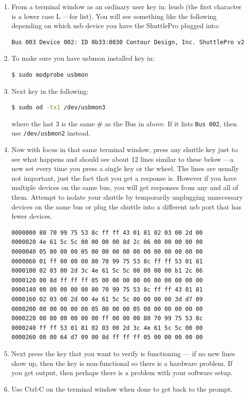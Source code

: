 \begin{enumerate}
    \item From a terminal window as an ordinary user key in:  lsusb  (the first character is a lower case L ---for
    list).  You will see something like the following depending on which usb device you have the
    ShuttlePro plugged into:
\begin{lstlisting}[language=Bash]
Bus 003 Device 002: ID 0b33:0030 Contour Design, Inc. ShuttlePro v2
\end{lstlisting}
    \item To make sure you have usbmon installed key in:
\begin{lstlisting}[language=Bash]
$ sudo modprobe usbmon
\end{lstlisting}
    \item Next key in the following:
\begin{lstlisting}[language=Bash]
$ sudo od -tx1 /dev/usbmon3
\end{lstlisting}
    where the last 3 is the same \# as the Bus in above.  If it lists \texttt{Bus 002}, then use \texttt{/dev/usbmon2} instead.
    \item Now with focus in that same terminal window, press any shuttle key just to see what happens and
    should see about 12 lines similar to these below ---a new set every time you press a single key or the
    wheel.  The lines are usually not important, just the fact that you get a response is.  However if you
    have multiple devices on the same bus, you will get responses from any and all of them.  Attempt to
    isolate your shuttle by temporarily unplugging unnecessary devices on the same bus or plug the 
    shuttle into a different usb port that has fewer devices.
    \begin{lstlisting}[language=Bash]
0000000 80 70 99 75 53 8c ff ff 43 01 81 02 03 00 2d 00 
0000020 4e 61 5c 5c 00 00 00 00 8d 2c 06 00 00 00 00 00 
0000040 05 00 00 00 05 00 00 00 00 00 00 00 00 00 00 00 
0000060 01 ff 00 00 00 80 70 99 75 53 8c ff ff 53 01 81 
0000100 02 03 00 2d 3c 4e 61 5c 5c 00 00 00 00 b1 2c 06 
0000120 00 8d ff ff ff 05 00 00 00 00 00 00 00 00 00 00 
0000140 00 00 00 00 00 80 70 99 75 53 8c ff ff 43 01 81 
0000160 02 03 00 2d 00 4e 61 5c 5c 00 00 00 00 3d d7 09 
0000200 00 00 00 00 00 05 00 00 00 05 00 00 00 00 00 00 
0000220 00 00 00 00 00 00 ff 00 00 00 80 70 99 75 53 8c 
0000240 ff ff 53 01 81 02 03 00 2d 3c 4e 61 5c 5c 00 00 
0000260 00 00 64 d7 09 00 8d ff ff ff 05 00 00 00 00 00
    \end{lstlisting}
    \item Next press the key that you want to verify is functioning --- if no new lines show up, then the key is
    non-functional so there is a hardware problem.  If you get output, then perhaps there is a problem
    with your software setup.
    \item Use Ctrl-C on the terminal window when done to get back to the prompt.
\end{enumerate}
